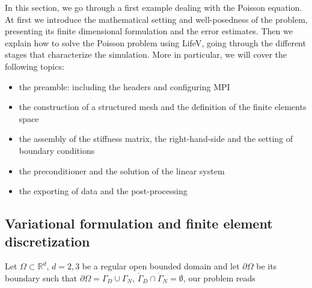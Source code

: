 In this section, we go through a first example dealing with the Poisson equation. At first we introduce the mathematical setting and well-posedness of the problem, presenting its finite dimensional formulation and the error estimates. Then we explain how to solve the Poisson problem using LifeV, going through the different stages that characterize the simulation. More in particular, we will cover the following topics: 
\begin{itemize}
	\item the preamble: including the headers and configuring MPI
	\item the construction of a structured mesh and the definition of the finite elements space
	\item the assembly of the stiffness matrix, the right-hand-side and the setting of boundary conditions
	\item the preconditioner and the solution of the linear system
	\item the exporting of data and the post-processing
\end{itemize}



\subsection{Variational formulation and finite element discretization}
Let $ \Omega \subset \mathbb{R}^d, \, d = 2,3 $ be a regular open bounded domain and let $  \partial \Omega $ be its boundary such that $ \partial \Omega = \Gamma_D \cup \Gamma_N$, $ \mathring{\Gamma}_D \cap \mathring{\Gamma}_N = \emptyset $, our problem reads

